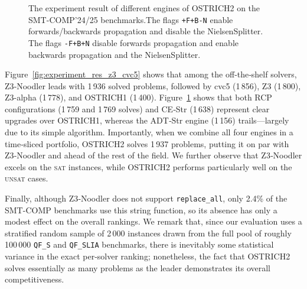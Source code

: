 \begin{figure}[htbp]
  
  \caption{The experiment result of different engines of OSTRICH2 on the SMT-COMP'24/25 benchmarks.The flags \texttt{+F+B-N} enable forwards/backwards propagation and disable the NielsenSplitter. The flags \texttt{-F+B+N} disable forwards propagation and enable backwards propagation and the NielsenSplitter.}
  \label{fig:experiment_res_ostrich}
\end{figure}


\noindent Figure~\ref{fig:experiment_res_z3_cvc5} shows that among the off‐the‐shelf solvers, Z3‐Noodler leads with 1\,936 solved problems, followed by cvc5 (1\,856), Z3 (1\,800), Z3-alpha (1\,778), and OSTRICH1 (1\,400).  Figure~\ref{fig:experiment_res_ostrich} shows that both RCP configurations (1\,759 and 1\,769 solves) and CE‐Str (1\,638) represent clear upgrades over OSTRICH1, whereas the ADT‐Str engine (1\,156) trails—largely due to its simple algorithm.
%
\noindent Importantly, when we combine all four engines in a time‐sliced portfolio, OSTRICH2 solves 1\,937 problems, putting it on par with Z3‐Noodler and ahead of the rest of the field.  We further observe that Z3‐Noodler excels on the \textsc{sat} instances, while OSTRICH2 performs particularly well on the \textsc{unsat} cases.

Finally, although Z3‐Noodler does not support \texttt{replace\_all}, only 2.4\% of the SMT-COMP benchmarks use this string function, so its absence has only a modest effect on the overall rankings. 
We remark that, since our evaluation uses a stratified random sample of 2\,000 instances drawn from the full pool of roughly 100\,000 \verb|QF_S| and \verb|QF_SLIA| benchmarks, there is inevitably some statistical variance in the exact per‐solver ranking; nonetheless, the fact that OSTRICH2 solves essentially as many problems as the leader demonstrates its overall competitiveness.  

